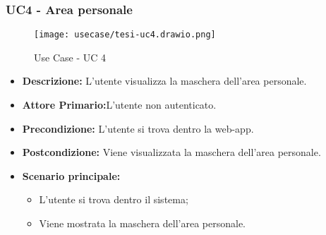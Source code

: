 \subsubsection{UC4 - Area personale}
\begin{figure}[H]
    \centering
    \texttt{[image: usecase/tesi-uc4.drawio.png]}
    \caption{Use Case - UC 4}
\end{figure}
\begin{itemize}
    \item \textbf{Descrizione:} L'utente visualizza la maschera dell'area personale.
    \item \textbf{Attore Primario:}L'utente non autenticato.
    \item \textbf{Precondizione:} L'utente si trova dentro la web-app.
    \item \textbf{Postcondizione:} Viene visualizzata la maschera dell'area personale.
    \item \textbf{Scenario principale:}
    \begin{itemize}
        \item L'utente si trova dentro il sistema;
        \item Viene mostrata la maschera dell'area personale.
    \end{itemize}
\end{itemize}
